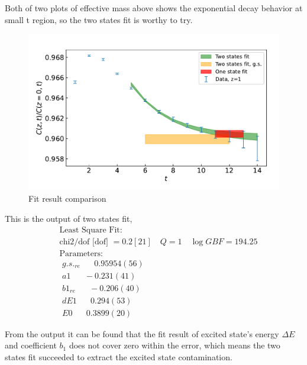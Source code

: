 \documentclass{article}
\begin{document}
Both of two plots of effective mass above shows the exponential decay behavior at small t region, so the two states fit is worthy to try.

\begin{figure}
    \centering
    \includegraphics[height=7cm,width=11.3cm]{fit_fig/g_fit_result.pdf}
    \caption{Fit result comparison}
\end{figure}

This is the output of two states fit,
\begin{equation}
    \begin{aligned}
    &\text { Least Square Fit: } \\
    &\text { chi2/dof [dof] }=0.2[21] \quad Q=1 \quad \log G B F=194.25 \\
    &\text { Parameters: } \\
    &\text { $g.s._{re}$ } \quad 0.95954 (56) \\
    &\text { $a1$ } \quad -0.231 (41) \\
    &\text { $b1_{re}$ } \quad -0.206 (40) \\
    &\text { $dE1$ } \quad 0.294 (53) \\
    &\text { $E0$ } \quad 0.3899 (20)
    \end{aligned}
\end{equation}

From the output it can be found that the fit result of excited state's energy $\Delta E$ and coefficient $b_1$ does not cover zero within the error, which means the two states fit succeeded to extract the excited state contamination.
\end{document}
